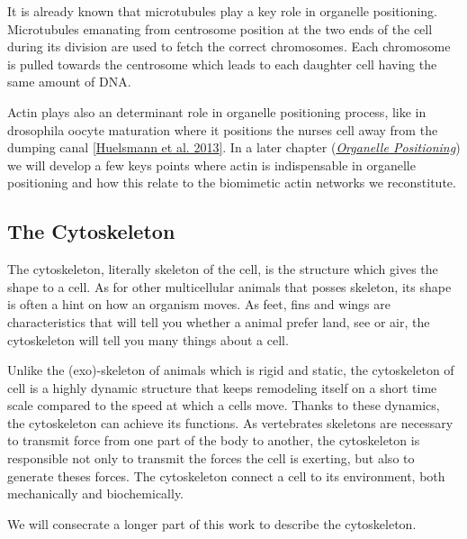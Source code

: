 \documentclass[A4paperpaper,11pt,english]{sphinxmanual}
\begin{document}
It is already known that microtubules play a key role in organelle positioning.
Microtubules emanating from centrosome position at the two ends of the cell
during its division are used to fetch the correct chromosomes. Each
chromosome is pulled towards the centrosome which leads to each daughter
cell having the same amount of DNA.

Actin plays also an determinant role in organelle positioning process,
like in drosophila oocyte maturation where it positions the nurses cell away
from the dumping canal {\hyperref[index-latex:huelsmann2013]{{[}Huelsmann et al. 2013{]}}}. In a later chapter ({\hyperref[index-latex:organelle-positioning]{\emph{Organelle
Positioning}}}) we will develop a few keys points where
actin is indispensable in organelle positioning and how this relate to the
biomimetic actin networks we reconstitute.


\subsection{The Cytoskeleton}
\label{index-latex:intro-cyto}\label{index-latex:the-cytoskeleton}
The cytoskeleton, literally skeleton of the cell, is the structure which gives
the shape to a cell.  As for other multicellular animals that posses
skeleton, its shape is often a hint on how an organism moves. As feet, fins and
wings are characteristics that will tell you whether a animal
prefer land, see or air, the cytoskeleton will tell you many
things about a cell.

Unlike the (exo)-skeleton of animals which is rigid and
static, the cytoskeleton of cell is a  highly dynamic structure that keeps
remodeling itself on a short time scale compared to the speed at which a cells
move. Thanks to these dynamics, the cytoskeleton can achieve its
functions.  As vertebrates skeletons are necessary to transmit force from one part
of the body to another, the cytoskeleton is responsible not only to
transmit the forces the cell is exerting, but also to generate theses forces.
The cytoskeleton connect a cell to its environment,
both mechanically and biochemically.

We will consecrate a longer part of this work to describe the cytoskeleton.
\end{document}

